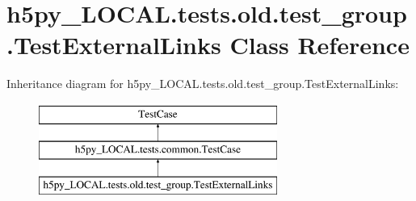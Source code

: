 \hypertarget{classh5py__LOCAL_1_1tests_1_1old_1_1test__group_1_1TestExternalLinks}{}\section{h5py\+\_\+\+L\+O\+C\+A\+L.\+tests.\+old.\+test\+\_\+group.\+Test\+External\+Links Class Reference}
\label{classh5py__LOCAL_1_1tests_1_1old_1_1test__group_1_1TestExternalLinks}
Inheritance diagram for h5py\+\_\+\+L\+O\+C\+A\+L.\+tests.\+old.\+test\+\_\+group.\+Test\+External\+Links\+:\begin{figure}[H]
\begin{center}
\leavevmode
\includegraphics[height=3.000000cm]{classh5py__LOCAL_1_1tests_1_1old_1_1test__group_1_1TestExternalLinks}
\end{center}
\end{figure}
